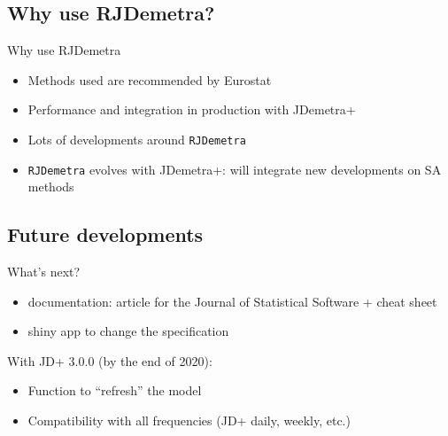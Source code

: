 \documentclass[10pt,xcolor=table,color={dvipsnames,usenames},ignorenonframetext,usepdftitle=false,french]{beamer}
\begin{document}
\hypertarget{why-use-rjdemetra}{%
\subsection{Why use RJDemetra?}\label{why-use-rjdemetra}}

\begin{frame}[fragile]{Why use RJDemetra \bcquestion}
\protect\hypertarget{why-use-rjdemetra-1}{}

\begin{itemize}
\item
  Methods used are recommended by Eurostat
\item
  Performance and integration in production with JDemetra+
\item
  Lots of \large\faRProject{} \normalsize developments around
  \texttt{RJDemetra}
\item
  \texttt{RJDemetra} evolves with JDemetra+: will integrate new
  developments on SA methods
\end{itemize}

\end{frame}

\hypertarget{future-developments}{%
\subsection{Future developments}\label{future-developments}}

\begin{frame}{What's next? \bcpanchant}
\protect\hypertarget{whats-next}{}

\begin{itemize}
\item
  documentation: article for the Journal of Statistical Software + cheat
  sheet
\item
  shiny app to change the specification
\end{itemize}

With JD+ 3.0.0 (by the end of 2020):

\begin{itemize}
\item
  Function to ``refresh'' the model
\item
  Compatibility with all frequencies (JD+ daily, weekly, etc.)
\end{itemize}

\end{frame}
\end{document}
